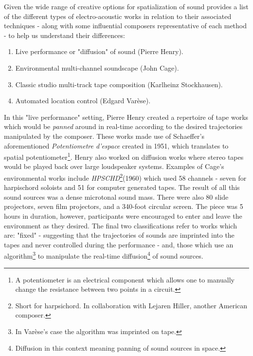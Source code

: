 Given the wide range of creative options for spatialization of sound \cite{zvonar2000extremely} provides a list of the different types of electro-acoustic works in relation to their associated techniques - along with some influential composers representative of each method - to help us understand their differences:

\begin{enumerate}
    \item Live performance or "diffusion" of sound (Pierre Henry).
    \item Environmental multi-channel soundscape (John Cage).
    \item Classic studio multi-track tape composition (Karlheinz Stockhausen).
    \item Automated location control (Edgard Varèse).
\end{enumerate}

In this "live performance" setting, Pierre Henry created a repertoire of tape works which would be \textit{panned} around in real-time according to the desired trajectories manipulated by the composer. These works made use of Schaeffer's aforementioned \textit{Potentiometre d'espace} created in 1951, which translates to spatial potentiometer\footnote{A potentiometer is an electrical component which allows one to manually change the resistance between two points in a circuit.}. Henry also worked on diffusion works where stereo tapes would be played back over large loudspeaker systems. Examples of Cage's environmental works include \textit{HPSCHD}\footnote{Short for harpsichord. In collaboration with Lejaren Hiller, another American composer.}(1960) which used 58 channels - seven for harpischord soloists and 51 for computer generated tapes. The result of all this sound sources was a dense microtonal sound mass. There were also 80 slide projectors, seven film projectors, and a 340-foot circular screen. The piece was 5 hours in duration, however, participants were encouraged to enter and leave the environment as they desired. The final two classifications refer to works which are: "fixed" - suggesting that the trajectories of sounds are imprinted into the tapes and never controlled during the performance - and, those which use an algorithm\footnote{In Varèse's case the algorithm was imprinted on tape.} to manipulate the real-time diffusion\footnote{Diffusion in this context meaning panning of sound sources in space.} of sound sources. 


